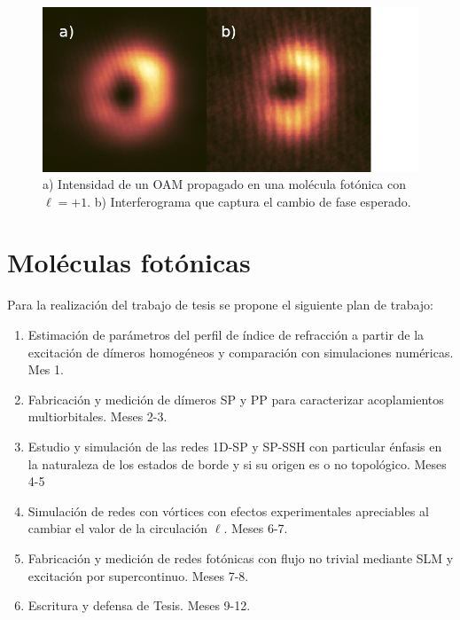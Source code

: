 \documentclass{article}
\begin{document}
\begin{figure}[H]
	\centering
	\includegraphics[width=0.5\linewidth]{./media/vortex.png}
	\caption{a) Intensidad de un OAM propagado en una molécula fotónica con $\ell = +1$. b) Interferograma que captura el cambio de fase esperado. \label{fig:vortex}}
\end{figure} 

\section{Moléculas fotónicas}

Para la realización del trabajo de tesis se propone el siguiente plan de trabajo:

\begin{enumerate}
	\item Estimación de parámetros del perfil de índice de refracción a partir de la excitación de dímeros homogéneos y comparación con simulaciones numéricas. Mes 1.
	\item Fabricación y medición de dímeros SP y PP para caracterizar acoplamientos multiorbitales. Meses 2-3.
	\item Estudio y simulación de las redes 1D-SP y SP-SSH con particular énfasis en la naturaleza de los estados de borde y si su origen es o no topológico. Meses 4-5
	\item Simulación de redes con vórtices con efectos experimentales apreciables al cambiar el valor de la circulación $\ell$. Meses 6-7.
	\item Fabricación y medición de redes fotónicas con flujo no trivial mediante SLM y excitación por supercontinuo. Meses 7-8.
	\item Escritura y defensa de Tesis. Meses 9-12.
\end{enumerate}


\renewcommand\refname{Referencias}




\end{document}

